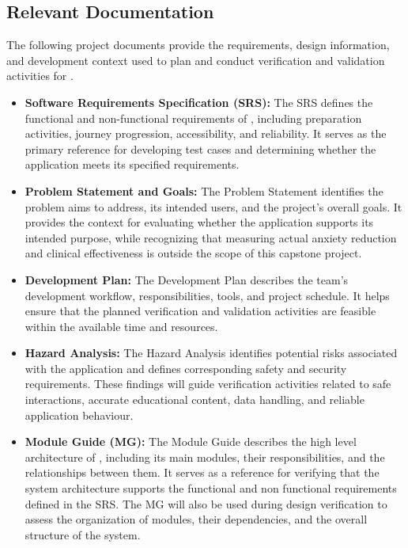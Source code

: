 \documentclass[10pt,titlepage]{article}
\begin{document}
\subsection{Relevant Documentation}

The following project documents provide the requirements,
design information, and development context used to plan
and conduct verification and validation activities for
\progname{}.

\begin{itemize}
    \item \textbf{Software Requirements Specification (SRS):}
    The SRS \cite{SRS} defines the functional and
    non-functional requirements of \progname{}, including
    preparation activities, journey progression, accessibility,
    and reliability. It serves as the primary reference for
    developing test cases and determining whether the
    application meets its specified requirements.

    \item \textbf{Problem Statement and Goals:}
    The Problem Statement \cite{ProblemStatement} identifies the problem
    \progname{} aims to address, its intended users, and the
    project's overall goals. It provides the context for
    evaluating whether the application supports its intended
    purpose, while recognizing that measuring actual anxiety
    reduction and clinical effectiveness is outside the
    scope of this capstone project.

    \item \textbf{Development Plan:}
    The Development Plan \cite{DevPlan} describes the team's
    development workflow, responsibilities, tools, and
    project schedule. It helps ensure that the planned
    verification and validation activities are feasible
    within the available time and resources.

    \item \textbf{Hazard Analysis:}
    The Hazard Analysis \cite{HazardAnalysis} identifies potential
    risks associated with the application and defines
    corresponding safety and security requirements.
    These findings will guide verification activities
    related to safe interactions, accurate educational
    content, data handling, and reliable application
    behaviour.

    \item \textbf{Module Guide (MG):}
    The Module Guide \cite{MG} describes the high level
    architecture of \progname{}, including its main modules,
    their responsibilities, and the relationships between
    them. It serves as a reference for verifying that the
    system architecture supports the functional and
    non functional requirements defined in the SRS.
    The MG will also be used during design verification
    to assess the organization of modules, their
    dependencies, and the overall structure of the system.


\end{itemize}
\end{document}
